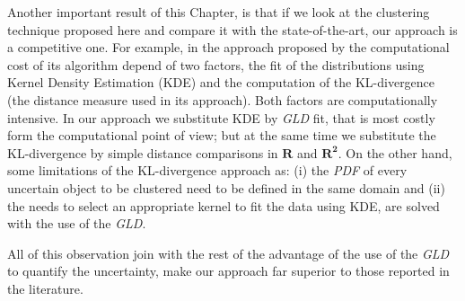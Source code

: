 Another important result of this Chapter, is that if we look at the clustering technique proposed here and compare it with the state-of-the-art, our approach is a competitive one. For example, in the approach proposed by \cite{Jiang} the computational cost of its algorithm depend of two factors, the fit of the distributions using Kernel Density Estimation (KDE) and the computation of the KL-divergence (the distance measure used in its approach). Both factors are computationally intensive. In our approach we substitute KDE by \textit{GLD} fit, that is most costly form the computational point of view; but at the same time we substitute the KL-divergence by simple distance comparisons in $\mathbf{R}$ and $\mathbf{R^2}$. On the other hand, some limitations of the KL-divergence approach as: (i) the \textit{PDF} of every uncertain object to be clustered need to be defined in the same domain and (ii) the needs to select an appropriate kernel to fit the data using KDE, are solved with the use of the \textit{GLD}.

All of this observation join with the rest of the advantage of the use of the \textit{GLD} to quantify the uncertainty, make our approach far superior to those reported in the literature.    